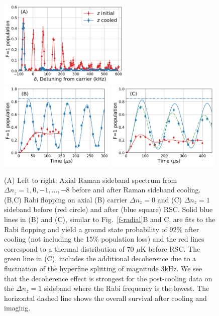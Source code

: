 \documentclass[aps,prl,twocolumn,groupedaddress]{revtex4-1}
\begin{document}
\begin{figure}
  \includegraphics[height=4.2cm]{imgs/spectrum_a1.pdf}
  \includegraphics[height=4.2cm]{imgs/rabi_flop_a1_0.pdf}
  \includegraphics[height=4.2cm]{imgs/rabi_flop_a1_p1.pdf}
  \caption{(A) Left to right: Axial Raman sideband spectrum from $\Delta n_z=1,0,-1,\ldots,-8$    before and after Raman sideband cooling.
    (B,C) Rabi flopping on axial (B) carrier $\Delta n_z=0$  and (C) $\Delta n_z=1$ sideband
    before (red circle) and after (blue square) RSC.
    Solid blue lines in (B) and (C), similar to Fig.~\ref{f-radial}B and C, are fits to  the Rabi flopping and yield  a ground state probability of $92$\% after cooling (not including the 15\% population loss) and
    the red lines correspond to a thermal distribution of $70$ $\mu$K before RSC.
    The green line in (C), includes the additional decoherence due to a fluctuation of the hyperfine splitting of magnitude 3kHz. %
    We see that the decoherence effect is  strongest for the post-cooling data on
    the $\Delta n_z=1$ sideband where the Rabi frequency is the lowest.
    The horizontal dashed line shows the overall survival after cooling and imaging.
    \label{f-axial}}
\end{figure}
\end{document}
